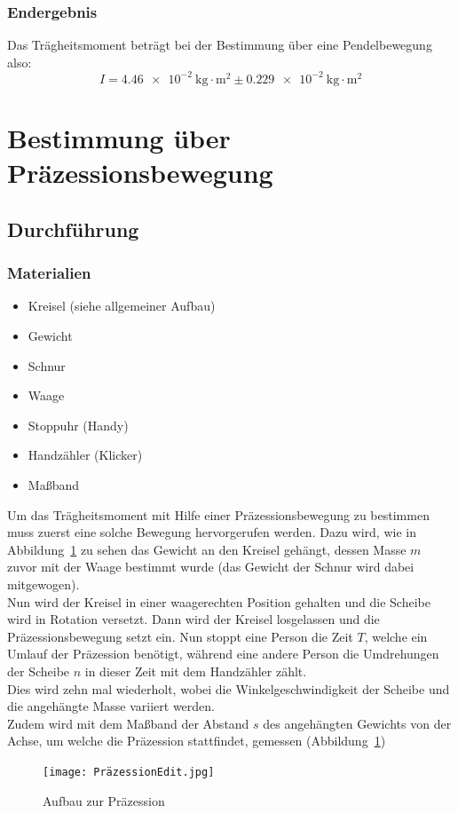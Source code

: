 \documentclass{article}
\begin{document}
	\subsubsection{Endergebnis}
	Das Trägheitsmoment beträgt bei der Bestimmung über eine Pendelbewegung also:
	\begin{equation}
		I = \SI{4,46e-2}{ \kilogram \cdot \metre^2 } \pm \SI{0,229e-2}{ \kilogram \cdot \metre^2 }
	\end{equation}

	\section{Bestimmung über Präzessionsbewegung}

	\subsection{Durchführung}
	\subsubsection{Materialien}
	\begin{itemize}
		\item Kreisel (siehe allgemeiner Aufbau)
		\item Gewicht
		\item Schnur
		\item Waage
		\item Stoppuhr (Handy)
		\item Handzähler (Klicker)
		\item Maßband
	\end{itemize}
	Um das Trägheitsmoment mit Hilfe einer Präzessionsbewegung zu bestimmen muss zuerst eine solche Bewegung hervorgerufen werden.
	Dazu wird, wie in Abbildung~\ref{fig:Präzession} zu sehen das Gewicht an den Kreisel gehängt, dessen Masse \(m\) zuvor mit der Waage bestimmt wurde (das Gewicht der Schnur wird dabei mitgewogen).\\
	Nun wird der Kreisel in einer waagerechten Position gehalten und die Scheibe wird in Rotation versetzt.
	Dann wird der Kreisel losgelassen und die Präzessionsbewegung setzt ein.
	Nun stoppt eine Person die Zeit \(T\), welche ein Umlauf der Präzession benötigt, während eine andere Person die Umdrehungen der Scheibe \(n\) in dieser Zeit mit dem Handzähler zählt.\\
	Dies wird zehn mal wiederholt, wobei die Winkelgeschwindigkeit der Scheibe und die angehängte Masse variiert werden.\\
	Zudem wird mit dem Maßband der Abstand \(s\) des angehängten Gewichts von der Achse, um welche die Präzession stattfindet, gemessen (Abbildung~\ref{fig:Präzession})
	\begin{figure}
		\centering
		\texttt{[image: PräzessionEdit.jpg]}
		\caption{\label{fig:Präzession}Aufbau zur Präzession}
	\end{figure}
\end{document}
